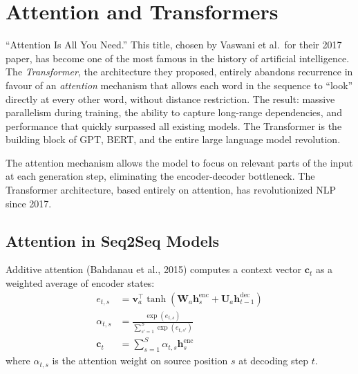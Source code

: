 \chapter{Attention and Transformers}
\label{ch:attention}

``Attention Is All You Need.'' This title, chosen by Vaswani et al.\ for their 2017 paper, has become one of the most famous in the history of artificial intelligence. The \emph{Transformer}, the architecture they proposed, entirely abandons recurrence in favour of an \emph{attention} mechanism that allows each word in the sequence to ``look'' directly at every other word, without distance restriction. The result: massive parallelism during training, the ability to capture long-range dependencies, and performance that quickly surpassed all existing models. The Transformer is the building block of GPT, BERT, and the entire large language model revolution.

\begin{intuition}[title=\textbf{Attention: looking where it matters}]
The attention mechanism allows the model to focus on relevant parts of the
input at each generation step, eliminating the encoder-decoder bottleneck.
The Transformer architecture, based entirely on attention, has revolutionized
NLP since 2017.
\end{intuition}

\section{Attention in Seq2Seq Models}
\label{sec:att:seq2seq}

\begin{definition}
Additive attention (Bahdanau et al., 2015) computes a context vector
$\mathbf{c}_t$ as a weighted average of encoder states:
\begin{align}
e_{t,s} &= \mathbf{v}_a^\top \tanh(\mathbf{W}_a \mathbf{h}_s^{\text{enc}} + \mathbf{U}_a \mathbf{h}_{t-1}^{\text{dec}}) \\
\alpha_{t,s} &= \frac{\exp(e_{t,s})}{\sum_{s'=1}^{S} \exp(e_{t,s'})} \\
\mathbf{c}_t &= \sum_{s=1}^{S} \alpha_{t,s} \mathbf{h}_s^{\text{enc}}
\end{align}
where $\alpha_{t,s}$ is the attention weight on source position $s$ at
decoding step $t$.
\end{definition}

